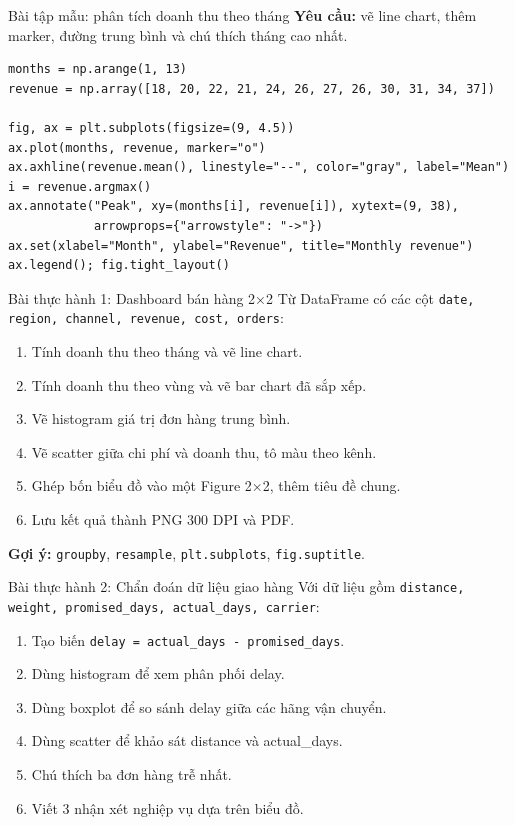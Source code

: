 \documentclass[aspectratio=169,12pt]{beamer}
\begin{document}
\begin{frame}[fragile]{Bài tập mẫu: phân tích doanh thu theo tháng}
\textbf{Yêu cầu:} vẽ line chart, thêm marker, đường trung bình và chú thích tháng cao nhất.
\begin{lstlisting}[style=py]
months = np.arange(1, 13)
revenue = np.array([18, 20, 22, 21, 24, 26, 27, 26, 30, 31, 34, 37])

fig, ax = plt.subplots(figsize=(9, 4.5))
ax.plot(months, revenue, marker="o")
ax.axhline(revenue.mean(), linestyle="--", color="gray", label="Mean")
i = revenue.argmax()
ax.annotate("Peak", xy=(months[i], revenue[i]), xytext=(9, 38),
            arrowprops={"arrowstyle": "->"})
ax.set(xlabel="Month", ylabel="Revenue", title="Monthly revenue")
ax.legend(); fig.tight_layout()
\end{lstlisting}
\end{frame}

\begin{frame}{Bài thực hành 1: Dashboard bán hàng 2×2}
Từ DataFrame có các cột \texttt{date, region, channel, revenue, cost, orders}:
\begin{enumerate}\setlength\itemsep{5pt}
  \item Tính doanh thu theo tháng và vẽ line chart.
  \item Tính doanh thu theo vùng và vẽ bar chart đã sắp xếp.
  \item Vẽ histogram giá trị đơn hàng trung bình.
  \item Vẽ scatter giữa chi phí và doanh thu, tô màu theo kênh.
  \item Ghép bốn biểu đồ vào một Figure 2×2, thêm tiêu đề chung.
  \item Lưu kết quả thành PNG 300 DPI và PDF.
\end{enumerate}
\textbf{Gợi ý:} \texttt{groupby}, \texttt{resample}, \texttt{plt.subplots}, \texttt{fig.suptitle}.
\end{frame}

\begin{frame}{Bài thực hành 2: Chẩn đoán dữ liệu giao hàng}
Với dữ liệu gồm \texttt{distance, weight, promised\_days, actual\_days, carrier}:
\begin{enumerate}\setlength\itemsep{5pt}
  \item Tạo biến \texttt{delay = actual\_days - promised\_days}.
  \item Dùng histogram để xem phân phối delay.
  \item Dùng boxplot để so sánh delay giữa các hãng vận chuyển.
  \item Dùng scatter để khảo sát distance và actual\_days.
  \item Chú thích ba đơn hàng trễ nhất.
  \item Viết 3 nhận xét nghiệp vụ dựa trên biểu đồ.
\end{enumerate}
\end{frame}
\end{document}
